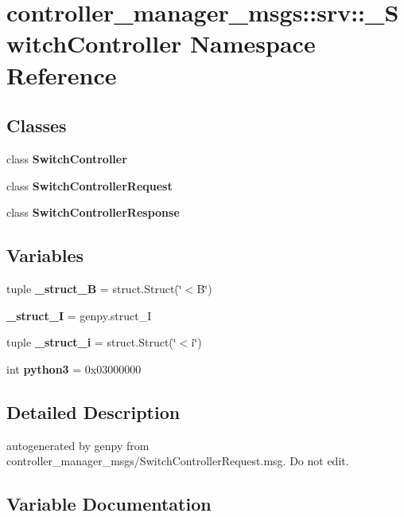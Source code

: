 \section{controller\-\_\-manager\-\_\-msgs\-:\-:srv\-:\-:\-\_\-\-Switch\-Controller \-Namespace \-Reference}
\label{namespacecontroller__manager__msgs_1_1srv_1_1__SwitchController}
\subsection*{\-Classes}
\begin{DoxyCompactItemize}
\item 
class {\bf \-Switch\-Controller}
\item 
class {\bf \-Switch\-Controller\-Request}
\item 
class {\bf \-Switch\-Controller\-Response}
\end{DoxyCompactItemize}
\subsection*{\-Variables}
\begin{DoxyCompactItemize}
\item 
tuple {\bf \-\_\-struct\-\_\-\-B} = struct.\-Struct(\char`\"{}$<$\-B\char`\"{})
\item 
{\bf \-\_\-struct\-\_\-\-I} = genpy.\-struct\-\_\-\-I
\item 
tuple {\bf \-\_\-struct\-\_\-i} = struct.\-Struct(\char`\"{}$<$i\char`\"{})
\item 
int {\bf python3} = 0x03000000
\end{DoxyCompactItemize}


\subsection{\-Detailed \-Description}
\begin{DoxyVerb}autogenerated by genpy from controller_manager_msgs/SwitchControllerRequest.msg. Do not edit.\end{DoxyVerb}
 

\subsection{\-Variable \-Documentation}
